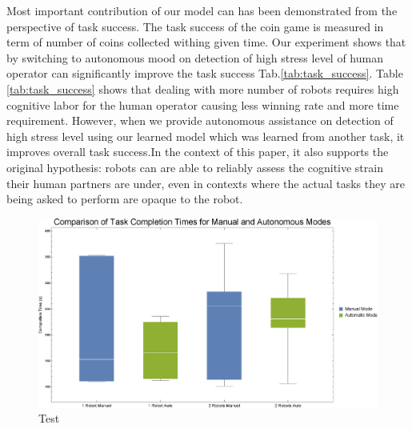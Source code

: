 \documentclass{sig-alternate}
\begin{document}
Most important contribution of our model can has been demonstrated from the perspective of task success. The task success of the coin game is measured in term of number of coins collected withing given time. Our experiment shows that by switching to autonomous mood on detection of high stress level of human operator can significantly improve the task success Tab.\ref{tab:task_success}. Table \ref{tab:task_success} shows that dealing with more number of robots requires high cognitive labor for the human operator causing less winning rate and more time requirement. However, when we provide autonomous assistance on detection of high stress level using our learned model which was learned from another task, it improves overall task success.In the context of this paper, it also supports the original hypothesis: robots can are able to reliably assess the cognitive strain their human partners are under, even in contexts where the actual tasks they are being asked to perform are opaque to the robot.

\begin{figure}
\centering
\includegraphics[width=.5\textwidth]{BoxWiskerTimesCompMaualVsAuto.eps}
\caption{Test}
\label{fig:BoxWiskersTimeComp}
\end{figure}
\end{document}
